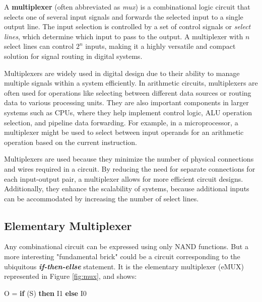 A \textbf{multiplexer} (often abbreviated as \textit{mux}) is a combinational logic circuit that selects one of several input signals and forwards the selected input to a single output line. The input selection is controlled by a set of control signals or \textit{select lines}, which determine which input to pass to the output. A multiplexer with $n$ select lines can control $2^n$ inputs, making it a highly versatile and compact solution for signal routing in digital systems.

Multiplexers are widely used in digital design due to their ability to manage multiple signals within a system efficiently. In arithmetic circuits, multiplexers are often used for operations like selecting between different data sources or routing data to various processing units. They are also important components in larger systems such as CPUs, where they help implement control logic, ALU operation selection, and pipeline data forwarding. For example, in a microprocessor, a multiplexer might be used to select between input operands for an arithmetic operation based on the current instruction.

Multiplexers are used because they minimize the number of physical connections and wires required in a circuit. By reducing the need for separate connections for each input-output pair, a multiplexer allows for more efficient circuit designs. Additionally, they enhance the scalability of systems, because additional inputs can be accommodated by increasing the number of select lines. 

\subsection{Elementary Multiplexer}

Any combinational circuit can be expressed using only NAND functions. But a more interesting "fundamental brick" could be a circuit corresponding to the ubiquitous {\bf {\em if-then-ellse}} statement. It is the elementary multiplexer (eMUX) represented in Figure \ref{fig:mux}, and shows:

\begin{center} O = {\bf if} (S) {\bf then} I1 {\bf else} I0 \end{center}

